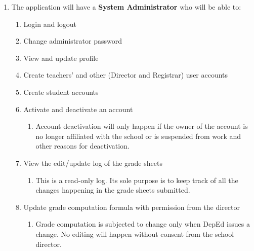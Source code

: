 \documentclass[11pt,a4paper,titlepage]{article}
\begin{document}
\begin{enumerate}
	\item The application will have a \textbf{System Administrator} who will be able to:
	\begin{enumerate}
		\item Login and logout
		\item Change administrator password
		\item View and update profile
		\item Create teachers' and other (Director and Registrar) user accounts
		\item Create student accounts
        \item Activate and deactivate an account 
        \begin{enumerate}
            \item Account deactivation will only happen if the owner of the account is no longer affiliated with the school or is suspended from work and other reasons for deactivation.
        \end{enumerate}
		\item View the edit/update log of the grade sheets
		\begin{enumerate}
            \item This is a read-only log. Its sole purpose is to keep track of all the changes happening in the grade sheets submitted.
        \end{enumerate}
		\item Update grade computation formula with permission from the director
		\begin{enumerate}
            \item Grade computation is subjected to change only when DepEd issues a change. No editing will happen without consent from the school director.
        \end{enumerate}

	\end{enumerate}
	

\end{enumerate}
\end{document}
